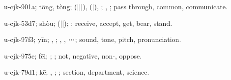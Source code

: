 \begin{multicols}{2}
{\cjkgGlue{}u-cjk-901a; tōng, tòng; \cjkgGlue{}\cjkgGlue{}(\cjkgGlue{}|\cjkgGlue{}|\cjkgGlue{}|\cjkgGlue{}), \cjkgGlue{}\cjkgGlue{}(\cjkgGlue{}|\cjkgGlue{}), \cjkgGlue{}\cjkgGlue{}\cjkgGlue{}; \cjkgGlue{}, \cjkgGlue{}; pass through, common, communicate.

\cjkgGlue{}u-cjk-53d7; shòu; \cjkgGlue{}\cjkgGlue{}(\cjkgGlue{}|\cjkgGlue{}|\cjkgGlue{}); \cjkgGlue{}; receive, accept, get, bear, stand.

\cjkgGlue{}u-cjk-97f3; yīn; \cjkgGlue{}, \cjkgGlue{}; \cjkgGlue{}, \cjkgGlue{}, {\mktsRsgFb{}⋯}\cjkgGlue{}; sound, tone, pitch, pronunciation.

\cjkgGlue{}u-cjk-975e; fēi; \cjkgGlue{}\cjkgGlue{}\cjkgGlue{}; \cjkgGlue{}; not, negative, non-, oppose.

\cjkgGlue{}u-cjk-79d1; kē; \cjkgGlue{}, \cjkgGlue{}; \cjkgGlue{}; section, department, science.

}
\end{multicols}
